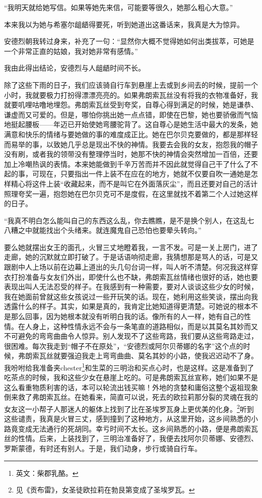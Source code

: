 \par “我明天就给她写信。如果等她先来信，可能要等很久，她那么粗心大意。”
\par 本来我以为她与希塞尔龃龉得要死，听到她道出这番话来，我真是大为惊异。
\par 安德烈朝我转过身来，补充了一句：“显然你大概不觉得她如何出类拔萃，可她是一个非常正直的姑娘，我对她非常有感情。”
\par 我由此得出结论，安德烈与人龃龉时间不长。
\par 除了这些下雨的日子，我们应该骑自行车到悬崖上去或到乡间去的时候，提前一个小时，我就要极力打扮得漂漂亮亮的。如果弗朗索瓦丝没有将我的衣物准备好，我就要叽哩咕噜地埋怨。弗朗索瓦丝受到夸奖，自尊心得到满足的时候，她是谦恭、谦虚而又可爱的。但是，哪怕你挑出她一点点错，即使在巴黎，她也要骄傲而气恼地挺起腰板——年迈已开始使她弯腰驼背了。这自尊心是她生活中最大的发条，她满意和快乐的情绪与要她做的事的难度成正比。她在巴尔贝克要做的，都是那样轻而易举的事，以致她几乎总是现出不快的神情。我要去会我的女友，抱怨我的帽子没有刷，或者我的领带没有整理停当时，她那不快的神情会突然增加一百倍，还要加上冷嘲热讽的表情。本来她能做到千辛万苦而并不因此就觉得自己干了什么了不起的事，可现在，只要指出一件上装不在应在的地方，她就不仅要自吹一通她是怎样精心将这件上装“收藏起来，而不是叫它在外面落灰尘”，而且还要对自己的活计照理夸奖一遍，抱怨她在巴尔贝克可不是度假，在这里就找不着第二个人过她这样的日子。
\par “我真不明白怎么能叫自己的东西这么乱，你去瞧瞧，是不是换个别人，在这乱七八糟之中就能找出个头绪来。就连魔鬼自己恐怕也要晕头转向。”
\par 要么她就摆出女王的面孔，火冒三丈地瞪着我，一言不发。可是一关上房门，进了走廊，她的沉默就立即打破了。于是话语响彻走廊，我猜想那是骂人的话，可是又跟剧中人上场以前在边幕上道出的头几句台词一样，叫人听不清楚。何况我这样穿衣打扮准备与女友们外出，即使什么也不缺，弗朗索瓦丝情绪也很好的话，她也要表现出叫人无法忍受的样子。在我感到有一种需要，要对人谈谈这些少女的时候，我在她面前曾就这些女孩说过一些开玩笑的话。现在，她利用这些笑谈，摆出向我透露什么的样子。其实，如果是真的，我肯定比她知道得更清楚。可她说的根本不是那么回事，因为她根本就没有听明白我的话。像所有的人一样，她有自己的性情。在人身上，这种性情永远不会与一条笔直的道路相似，而是以其莫名其妙而又不可避免的弯弯曲曲令人惊异。别人发现不了这些弯路，我们要从这些弯路走过，很困难。每次我走到“帽子不在原处”，“安德烈或阿尔贝蒂娜的名字”这个点的时候，弗朗索瓦丝就要强迫我走上弯弯曲曲、莫名其妙的小路，使我迟迟动不了身。我吩咐给我准备夹chester\footnote{英文：柴郡乳酪。}和生菜的三明治和买点心时，也是这样。这是准备到了吃茶点的时候，我和这些少女在悬崖上吃的。可是弗朗索瓦丝宣称，她们如果不是这么看重物质利害的话，本可以轮流出钱买嘛！外地的贪婪和庸俗这整个返祖现象倒来救了弗朗索瓦丝。在她看来，简直可以说，死去的欧拉莉那分裂的灵魂在我的女友这一小帮子人那迷人的躯体上找到了比在圣埃罗瓦身上更优美的化身。\footnote{见《贡布雷》，女圣徒欧拉莉在勃艮第变成了圣埃罗瓦。}听到这些谴责，我真是火冒三丈，感到撞到了这种地方，从这里开始，这乡间熟悉的小路竟变成无法通行的死胡同。幸亏时间不太长。这乡间熟悉的小路，便是弗朗索瓦丝的性情。后来，上装找到了，三明治准备好了，我便去找阿尔贝蒂娜、安德烈、罗斯蒙德，有时还有别人。于是，我们动身，步行或骑自行车。
